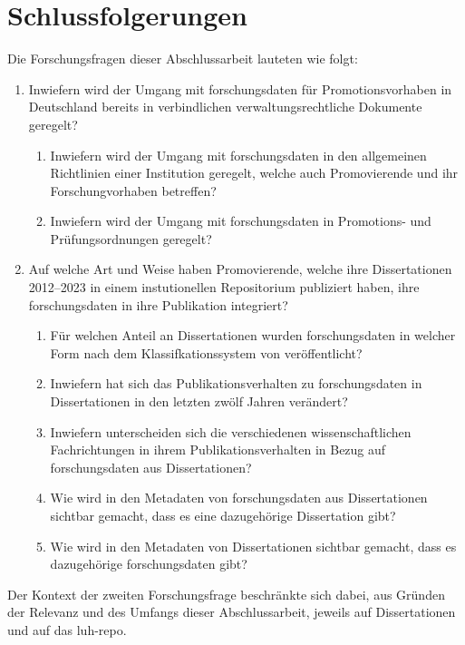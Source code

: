 \chapter{Schlussfolgerungen}\label{ch:schlussfolgerungen}
Die Forschungsfragen dieser Abschlussarbeit lauteten wie folgt:
\begin{enumerate}
    \item Inwiefern wird der Umgang mit \gls{forschungsdaten} für Promotionsvorhaben in Deutschland bereits in verbindlichen verwaltungsrechtliche Dokumente geregelt?
    \begin{enumerate}
        \item Inwiefern wird der Umgang mit \gls{forschungsdaten} in den allgemeinen Richtlinien einer Institution geregelt, welche auch Promovierende und ihr Forschungvorhaben betreffen?
        \item Inwiefern wird der Umgang mit \gls{forschungsdaten} in Promotions- und Prüfungsordnungen geregelt?
    \end{enumerate}
    \item Auf welche Art und Weise haben Promovierende, welche ihre Dissertationen 2012--2023 in einem instutionellen Repositorium publiziert haben, ihre \gls{forschungsdaten} in ihre Publikation integriert?
    \begin{enumerate}
        \item Für welchen Anteil an Dissertationen wurden \gls{forschungsdaten} in welcher Form nach dem Klassifkationssystem von \citeauthor{ReillyEtAl2011} \autocite{ReillyEtAl2011} veröffentlicht?
        \item Inwiefern hat sich das Publikationsverhalten zu \gls{forschungsdaten} in Dissertationen in den letzten zwölf Jahren verändert?
        \item Inwiefern unterscheiden sich die verschiedenen wissenschaftlichen Fachrichtungen in ihrem Publikationsverhalten in Bezug auf \gls{forschungsdaten} aus Dissertationen?
        \item Wie wird in den Metadaten von \gls{forschungsdaten} aus Dissertationen sichtbar gemacht, dass es eine dazugehörige Dissertation gibt?
        \item Wie wird in den Metadaten von Dissertationen sichtbar gemacht, dass es dazugehörige \gls{forschungsdaten} gibt?
    \end{enumerate}
\end{enumerate}
Der Kontext der zweiten Forschungsfrage beschränkte sich dabei, aus Gründen der Relevanz und des Umfangs dieser Abschlussarbeit, jeweils auf Dissertationen und auf das \gls{luh-repo}.

